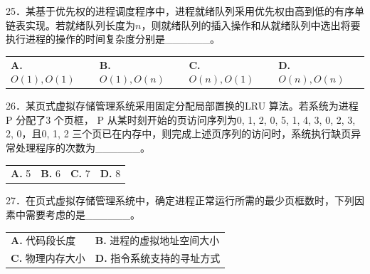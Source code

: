 \documentclass[UTF8,11pt]{ctexart}
\begin{document}
25．某基于优先权的进程调度程序中，进程就绪队列采用优先权由高到低的有序单链表实现。若就绪队列长度为\(\displaystyle n\)，则就绪队列的插入操作和从就绪队列中选出将要执行进程的操作的时间复杂度分别是\_\_\_\_\_\_。


\begin{center}\begin{tabular}{>{\raggedright\arraybackslash}p{\dimexpr(\linewidth-8\tabcolsep)/4\relax}>{\raggedright\arraybackslash}p{\dimexpr(\linewidth-8\tabcolsep)/4\relax}>{\raggedright\arraybackslash}p{\dimexpr(\linewidth-8\tabcolsep)/4\relax}>{\raggedright\arraybackslash}p{\dimexpr(\linewidth-8\tabcolsep)/4\relax}}
\textbf{A.} \(\displaystyle O(1),\allowbreak O(1)\) & \textbf{B.} \(\displaystyle O(1),\allowbreak O(n)\) & \textbf{C.} \(\displaystyle O(n),\allowbreak O(1)\) & \textbf{D.} \(\displaystyle O(n),\allowbreak O(n)\)\\[.35em]\end{tabular}\end{center}

26．某页式虚拟存储管理系统采用固定分配局部置换的LRU 算法。若系统为进程P 分配了3 个页框， P 从某时刻开始的页访问序列为0, 1, 2, 0, 5, 1, 4, 3, 0, 2, 3, 2, 0，且0, 1, 2 三个页已在内存中，则完成上述页序列的访问时，系统执行缺页异常处理程序的次数为\_\_\_\_\_\_。


\begin{center}\begin{tabular}{>{\raggedright\arraybackslash}p{\dimexpr(\linewidth-8\tabcolsep)/4\relax}>{\raggedright\arraybackslash}p{\dimexpr(\linewidth-8\tabcolsep)/4\relax}>{\raggedright\arraybackslash}p{\dimexpr(\linewidth-8\tabcolsep)/4\relax}>{\raggedright\arraybackslash}p{\dimexpr(\linewidth-8\tabcolsep)/4\relax}}
\textbf{A.} 5 & \textbf{B.} 6 & \textbf{C.} 7 & \textbf{D.} 8\\[.35em]\end{tabular}\end{center}

27．在页式虚拟存储管理系统中，确定进程正常运行所需的最少页框数时，下列因素中需要考虑的是\_\_\_\_\_\_。


\begin{center}\begin{tabular}{>{\raggedright\arraybackslash}p{\dimexpr(\linewidth-4\tabcolsep)/2\relax}>{\raggedright\arraybackslash}p{\dimexpr(\linewidth-4\tabcolsep)/2\relax}}
\textbf{A.} 代码段长度 & \textbf{B.} 进程的虚拟地址空间大小\\[.35em]
\textbf{C.} 物理内存大小 & \textbf{D.} 指令系统支持的寻址方式\\[.35em]\end{tabular}\end{center}
\end{document}
